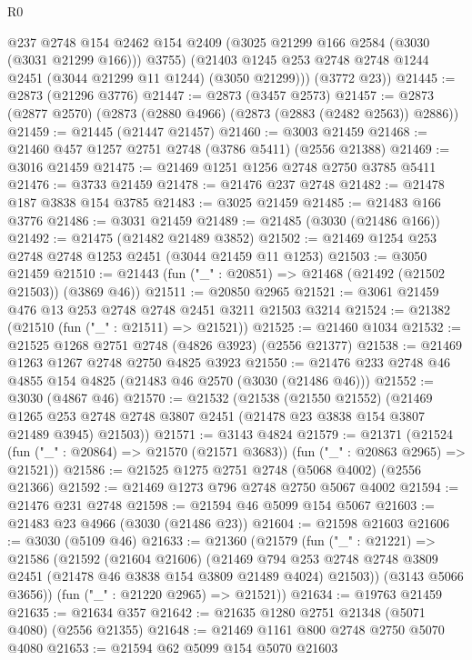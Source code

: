 \begin{lexlean}{R0}
\begin{coremodule}
          @237
          @2748
          @154
          @2462
          @154
          @2409
          (@3025 @21299 @166 @2584 (@3030 (@3031 @21299 @166)))
          @3755)
        (@21403 @1245 @253 @2748 @2748 @1244 @2451 (@3044 @21299 @11 @1244) (@3050 @21299)))
      (@3772 @23))
@21445 := @2873 (@21296 @3776)
@21447 := @2873 (@3457 @2573)
@21457 := @2873 (@2877 @2570) (@2873 (@2880 @4966) (@2873 (@2883 (@2482 @2563)) @2886))
@21459 := @21445 (@21447 @21457)
@21460 := @3003 @21459
@21468 := @21460 @457 @1257 @2751 @2748 (@3786 @5411) (@2556 @21388)
@21469 := @3016 @21459
@21475 := @21469 @1251 @1256 @2748 @2750 @3785 @5411
@21476 := @3733 @21459
@21478 := @21476 @237 @2748
@21482 := @21478 @187 @3838 @154 @3785
@21483 := @3025 @21459
@21485 := @21483 @166 @3776
@21486 := @3031 @21459
@21489 := @21485 (@3030 (@21486 @166))
@21492 := @21475 (@21482 @21489 @3852)
@21502 := @21469 @1254 @253 @2748 @2748 @1253 @2451 (@3044 @21459 @11 @1253)
@21503 := @3050 @21459
@21510 := @21443 (fun ("_" : @20851) => @21468 (@21492 (@21502 @21503)) (@3869 @46))
@21511 := @20850 @2965
@21521 := @3061 @21459 @476 @13 @253 @2748 @2748 @2451 @3211 @21503 @3214
@21524 := @21382 (@21510 (fun ("_" : @21511) => @21521))
@21525 := @21460 @1034
@21532 := @21525 @1268 @2751 @2748 (@4826 @3923) (@2556 @21377)
@21538 := @21469 @1263 @1267 @2748 @2750 @4825 @3923
@21550 := @21476 @233 @2748 @46 @4855 @154 @4825 (@21483 @46 @2570 (@3030 (@21486 @46)))
@21552 := @3030 (@4867 @46)
@21570 := @21532
    (@21538
      (@21550 @21552)
      (@21469 @1265 @253 @2748 @2748 @3807 @2451 (@21478 @23 @3838 @154 @3807 @21489 @3945) @21503))
@21571 := @3143 @4824
@21579 := @21371
    (@21524 (fun ("_" : @20864) => @21570 (@21571 @3683)) (fun ("_" : @20863 @2965) => @21521))
@21586 := @21525 @1275 @2751 @2748 (@5068 @4002) (@2556 @21366)
@21592 := @21469 @1273 @796 @2748 @2750 @5067 @4002
@21594 := @21476 @231 @2748
@21598 := @21594 @46 @5099 @154 @5067
@21603 := @21483 @23 @4966 (@3030 (@21486 @23))
@21604 := @21598 @21603
@21606 := @3030 (@5109 @46)
@21633 := @21360
    (@21579
      (fun ("_" : @21221) =>
      @21586
        (@21592
          (@21604 @21606)
          (@21469
            @794
            @253
            @2748
            @2748
            @3809
            @2451
            (@21478 @46 @3838 @154 @3809 @21489 @4024)
            @21503))
        (@3143 @5066 @3656))
      (fun ("_" : @21220 @2965) => @21521))
@21634 := @19763 @21459
@21635 := @21634 @357
@21642 := @21635 @1280 @2751 @21348 (@5071 @4080) (@2556 @21355)
@21648 := @21469 @1161 @800 @2748 @2750 @5070 @4080
@21653 := @21594 @62 @5099 @154 @5070 @21603

\end{coremodule}
\end{lexlean}
